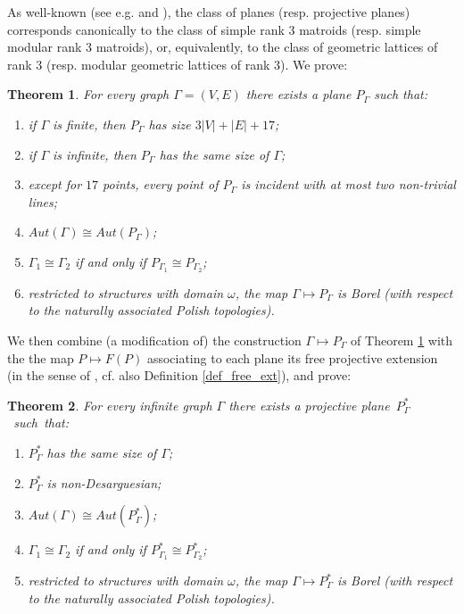 \documentclass{amsart}
\newtheorem{theorem}{Theorem}%
\numberwithin{claimcounter}{theorem}
\begin{document}
	As well-known (see e.g. \cite{rota} and \cite[pg. 148]{kung}), the class of planes (resp. projective planes) corresponds canonically to the class of simple rank $3$ matroids (resp. simple modular rank $3$ matroids), or, equivalently, to the class of geometric lattices of rank $3$ (resp. modular geometric lattices of rank $3$). We prove:

	\begin{theorem}\label{main_theorem} For every graph $\Gamma = (V, E)$ there exists a plane $P_{\Gamma}$ such that:
	\begin{enumerate}[(1)]
	\item if $\Gamma$ is finite, then $P_{\Gamma}$ has size $3|V| + |E| + 17$;
	\item if $\Gamma$ is infinite, then $P_{\Gamma}$ has the same size of $\Gamma$;
	\item except for $17$ points, every point of  $P_{\Gamma}$ is incident with at most two non-trivial lines;
	\item\label{auto}  $Aut(\Gamma) \cong Aut(P_{\Gamma})$;
	\item\label{iso_invariance} $\Gamma_1  \cong \Gamma_2$ if and only if $P_{\Gamma_1} \cong P_{\Gamma_2}$;
	\item restricted to structures with domain $\omega$, the map $\Gamma \mapsto P_{\Gamma}$ is Borel (with respect to the naturally associated Polish topologies).
\end{enumerate}
\end{theorem}

	We then combine (a modification of) the construction $\Gamma \mapsto P_{\Gamma}$ of Theorem \ref{main_theorem} with the the map $P \mapsto F(P)$ associating to each plane its free projective extension (in the sense of \cite{hall_proj}, cf. also Definition \ref{def_free_ext}), and prove:

\begin{theorem}\label{main_theorem_proj} For every infinite graph $\Gamma$ there exists a projective \mbox{plane $P^*_{\Gamma}$ such that:}
	\begin{enumerate}[(1)]
	\item $P^*_{\Gamma}$ has the same size of $\Gamma$;
	\item $P^*_{\Gamma}$ is non-Desarguesian;
	\item $Aut(\Gamma) \cong Aut(P^*_{\Gamma})$;
	\item $\Gamma_1  \cong \Gamma_2$ if and only if $P^*_{\Gamma_1} \cong P^*_{\Gamma_2}$;
	\item restricted to structures with domain $\omega$, the map $\Gamma \mapsto P^*_{\Gamma}$ is Borel (with respect to the naturally associated Polish topologies).
\end{enumerate}
\end{theorem}	
\end{document}
